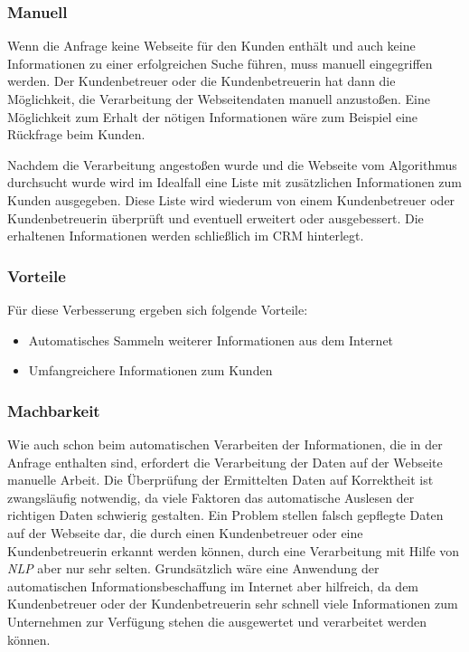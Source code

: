 \subsubsection{Manuell}
Wenn die Anfrage keine Webseite für den Kunden enthält und auch keine Informationen zu einer erfolgreichen Suche führen, muss manuell eingegriffen werden. Der Kundenbetreuer oder die Kundenbetreuerin hat dann die Möglichkeit, die Verarbeitung der Webseitendaten manuell anzustoßen. Eine Möglichkeit zum Erhalt der nötigen Informationen wäre zum Beispiel eine Rückfrage beim Kunden. 

Nachdem die Verarbeitung angestoßen wurde und die Webseite vom Algorithmus durchsucht wurde wird im Idealfall eine Liste mit zusätzlichen Informationen zum Kunden ausgegeben. Diese Liste wird wiederum von einem Kundenbetreuer oder Kundenbetreuerin überprüft und eventuell erweitert oder ausgebessert. Die erhaltenen Informationen werden schließlich im CRM hinterlegt.

\subsubsection{Vorteile}
Für diese Verbesserung ergeben sich folgende Vorteile:

\begin{itemize}
	\item Automatisches Sammeln weiterer Informationen aus dem Internet 
	\item Umfangreichere Informationen zum Kunden
\end{itemize}

\subsubsection{Machbarkeit}
Wie auch schon beim automatischen Verarbeiten der Informationen, die in der Anfrage enthalten sind, erfordert die Verarbeitung der Daten auf der Webseite manuelle Arbeit. Die Überprüfung der Ermittelten Daten auf Korrektheit ist zwangsläufig notwendig, da viele Faktoren das automatische Auslesen der richtigen Daten schwierig gestalten. Ein Problem stellen falsch gepflegte Daten auf der Webseite dar, die durch einen Kundenbetreuer oder eine Kundenbetreuerin erkannt werden können, durch eine Verarbeitung mit Hilfe von \textit{NLP} aber nur sehr selten. Grundsätzlich wäre eine Anwendung der automatischen Informationsbeschaffung im Internet aber hilfreich, da dem Kundenbetreuer oder der Kundenbetreuerin sehr schnell viele Informationen zum Unternehmen zur Verfügung stehen die ausgewertet und verarbeitet werden können.

